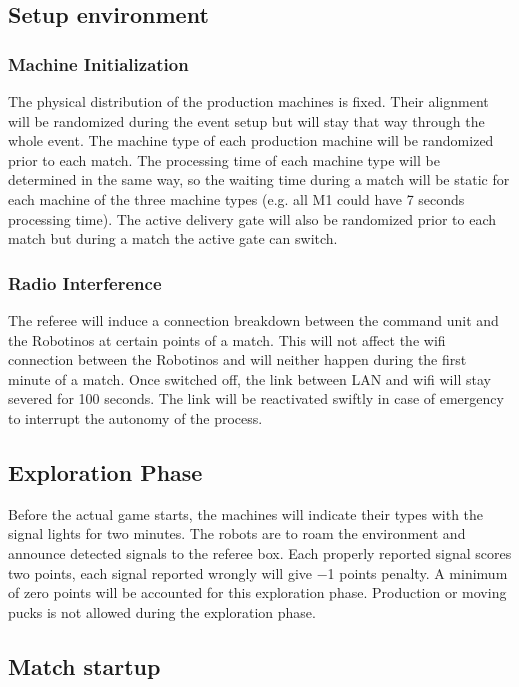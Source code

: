 \documentclass[12pt,twoside]{article}
\begin{document}
\subsection{Setup environment}
\subsubsection{Machine Initialization}

The physical distribution of the production machines is fixed. Their
alignment will be randomized during the event setup but will stay that
way through the whole event. The machine type of each production
machine will be randomized prior to each match. The processing time of
each machine type will be determined in the same way, so the waiting
time during a match will be static for each machine of the three
machine types (e.g. all M1 could have 7 seconds processing time). The
active delivery gate will also be randomized prior to each match but
during a match the active gate can switch.


\subsubsection{Radio Interference}
\label{sec:radio-interference}
The referee will induce a connection breakdown between the command
unit and the Robotinos at certain points of a match. This will not
affect the wifi connection between the Robotinos and will neither
happen during the first minute of a match. Once switched off, the link
between LAN and wifi will stay severed for 100 seconds. The link will
be reactivated swiftly in case of emergency to interrupt the autonomy
of the process.


\subsection{Exploration Phase} \label{sec:expphase} 
%
Before the actual game starts, the machines will indicate their types
with the signal lights for two minutes. The robots are to roam the
environment and announce detected signals to the referee box. Each
properly reported signal scores two points, each signal reported
wrongly will give \num{-1} points penalty.  A minimum of zero points
will be accounted for this exploration phase.  Production or moving
pucks is not allowed during the exploration phase.


\subsection{Match startup}
\label{sec:match-startup}
\end{document}
